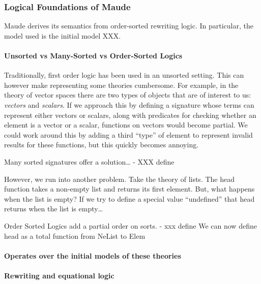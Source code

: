 \documentclass[]{article}
\let\oldparagraph\paragraph
\renewcommand{\paragraph}[1]{\oldparagraph{#1}\mbox{}}
\begin{document}
\hypertarget{logical-foundations-of-maude}{%
\subsubsection{Logical Foundations of
Maude}\label{logical-foundations-of-maude}}

Maude derives its semantics from order-sorted rewriting logic. In
particular, the model used is the initial model XXX.

\hypertarget{unsorted-vs-many-sorted-vs-order-sorted-logics}{%
\paragraph{Unsorted vs Many-Sorted vs Order-Sorted
Logics}\label{unsorted-vs-many-sorted-vs-order-sorted-logics}}

Traditionally, first order logic has been used in an unsorted setting.
This can however make representing some theories cumbersome. For
example, in the theory of vector spaces there are two types of objects
that are of interest to us: \emph{vectors} and \emph{scalars}. If we
approach this by defining a signature whose terms can represent either
vectors or scalars, along with predicates for checking whether an
element is a vector or a scalar, functions on vectors would become
partial. We could work around this by adding a third ``type'' of element
to represent invalid results for these functions, but this quickly
becomes annoying.

Many sorted signatures offer a solution\ldots{} - XXX define

However, we run into another problem. Take the theory of lists. The head
function takes a non-empty list and returns its first element. But, what
happens when the list is empty? If we try to define a special value
``undefined'' that head returns when the list is empty\ldots{}

Order Sorted Logics add a partial order on sorts. - xxx define We can
now define head as a total function from NeList to Elem

\hypertarget{operates-over-the-initial-models-of-these-theories}{%
\paragraph{Operates over the initial models of these
theories}\label{operates-over-the-initial-models-of-these-theories}}

\hypertarget{rewriting-and-equational-logic}{%
\paragraph{Rewriting and equational
logic}\label{rewriting-and-equational-logic}}
\end{document}
